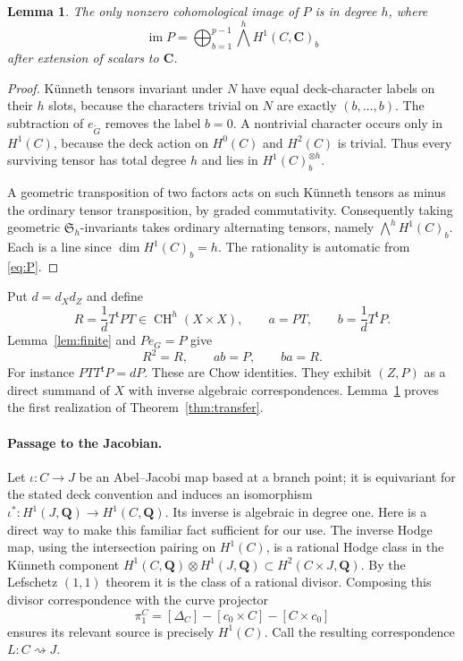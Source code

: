 \documentclass[11pt]{article}
\newtheorem{lemma}[theorem]{Lemma}
\theoremstyle{remark}\newtheorem{remark}[theorem]{Remark}
\newcommand{\Q}{\mathbf Q}\newcommand{\C}{\mathbf C}
\newcommand{\CH}{\operatorname{CH}}\newcommand{\Sym}{\operatorname{Sym}}
\newcommand{\im}{\operatorname{im}}\newcommand{\id}{\operatorname{id}}
\begin{document}
\begin{lemma}\label{lem:cohom}
The only nonzero cohomological image of $P$ is in degree $h$, where
\[
 \im P=\bigoplus_{b=1}^{p-1}\bigwedge^hH^1(C,\C)_b
\]
after extension of scalars to $\C$.
\end{lemma}
\begin{proof}
K\"unneth tensors invariant under $N$ have equal deck-character labels
on their $h$ slots, because the characters trivial on $N$ are exactly
$(b,\ldots,b)$. The subtraction of $e_{\widetilde G}$ removes the label
$b=0$. A nontrivial character occurs only in $H^1(C)$, because the deck
action on $H^0(C)$ and $H^2(C)$ is trivial. Thus every surviving tensor
has total degree $h$ and lies in $H^1(C)_b^{\otimes h}$.

A geometric transposition of two factors acts on such K\"unneth tensors
as minus the ordinary tensor transposition, by graded commutativity.
Consequently taking geometric $\mathfrak S_h$-invariants takes ordinary
alternating tensors, namely $\bigwedge^hH^1(C)_b$. Each is a line since
$\dim H^1(C)_b=h$. The rationality is automatic from \eqref{eq:P}.
\end{proof}

Put $d=d_Xd_Z$ and define
\[
 R=\frac1d T^{\mathsf t}PT\in\CH^h(X\times X),\qquad
 a=PT,\qquad b=\frac1d T^{\mathsf t}P.
\]
Lemma~\ref{lem:finite} and $Pe_G=P$ give
\[
 R^2=R,\qquad ab=P,\qquad ba=R.
\]
For instance $PTT^{\mathsf t}P=dP$. These are Chow identities.
They exhibit $(Z,P)$ as a direct summand of $X$ with inverse algebraic
correspondences. Lemma~\ref{lem:cohom} proves the first realization of
Theorem~\ref{thm:transfer}.

\paragraph{Passage to the Jacobian.}
Let $\iota:C\to J$ be an Abel--Jacobi map based at a branch point; it is
equivariant for the stated deck convention and induces an isomorphism
$\iota^*:H^1(J,\Q)\to H^1(C,\Q)$. Its inverse is algebraic in degree one.
Here is a direct way to make this familiar fact sufficient for our use.
The inverse Hodge map, using the intersection pairing on $H^1(C)$, is a
rational Hodge class in the K\"unneth component
$H^1(C,\Q)\otimes H^1(J,\Q)\subset H^2(C\times J,\Q)$.
By the Lefschetz $(1,1)$ theorem it is the class of a rational divisor.
Composing this divisor correspondence with the curve projector
\[
 \pi_1^C=[\Delta_C]-[c_0\times C]-[C\times c_0]
\]
ensures its relevant source is precisely $H^1(C)$.
Call the resulting correspondence $L:C\rightsquigarrow J$.
\end{document}
